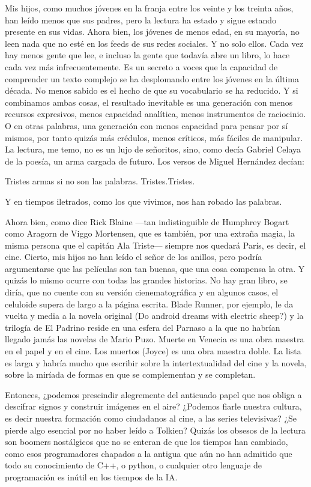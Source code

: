 Mis hijos, como muchos jóvenes en la franja entre los veinte y los treinta años, han leído menos que sus padres, pero la lectura ha estado y sigue estando presente en sus vidas. Ahora bien, los jóvenes de menos edad, en su mayoría, no leen nada que no esté en los feeds de sus redes sociales. Y no solo ellos. Cada vez hay menos gente que lee, e incluso la gente que todavía abre un libro, lo hace cada vez más infrecuentemente. Es un secreto a voces que la capacidad de comprender un texto complejo se ha desplomando entre los jóvenes en la última década. No menos sabido es el hecho de que su vocabulario se ha reducido. Y si combinamos ambas cosas, el resultado inevitable es una generación con menos recursos expresivos, menos capacidad analítica, menos instrumentos de raciocinio. O en otras palabras, una generación con menos capacidad para pensar por sí mismos, por tanto quizás más crédulos, menos críticos, más fáciles de manipular. La lectura, me temo, no es un lujo de señoritos, sino, como decía Gabriel Celaya de la poesía, un arma cargada de futuro. Los versos de Miguel Hernández decían:

Tristes armas
si no son las palabras.
Tristes.Tristes.

Y en tiempos iletrados, como los que vivimos, nos han robado las palabras.

Ahora bien, como dice Rick Blaine ---tan indistinguible de Humphrey Bogart como Aragorn de Viggo Mortensen, que es también, por una extraña magia, la misma persona que el capitán Ala Triste--- siempre nos quedará París, es decir, el cine. Cierto, mis hijos no han leído el señor de los anillos, pero podría argumentarse que las películas son tan buenas, que una cosa compensa la otra. Y quizás lo mismo ocurre con todas las grandes historias. No hay gran libro, se diría, que no cuente con su versión cienematográfica y en algunos casos, el celuloide supera de largo a la página escrita. Blade Runner, por ejemplo, le da vuelta y media a la novela original (Do android dreams with electric sheep?) y la trilogía de El Padrino reside en una esfera del Parnaso a la que no habrían llegado jamás las novelas de Mario Puzo. Muerte en Venecia es una obra maestra en el papel y en el cine. Los muertos (Joyce) es una obra maestra doble. La lista es larga y habría mucho que escribir sobre la intertextualidad del cine y la novela, sobre la miríada de formas en que se complementan y se completan. 

Entonces, ¿podemos prescindir alegremente del anticuado papel que nos obliga a descifrar signos y construir imágenes en el aire? ¿Podemos fiarle nuestra cultura, es decir nuestra formación como ciudadanos al cine, a las series televisivas? ¿Se pierde algo esencial por no haber leído a Tolkien? Quizás los obsesos de la lectura son boomers nostálgicos que no se enteran de que los tiempos han cambiado, como esos programadores chapados a la antigua que aún no han admitido que todo su conocimiento de C++, o python, o cualquier otro lenguaje de programación es inútil en los tiempos de la IA. 

